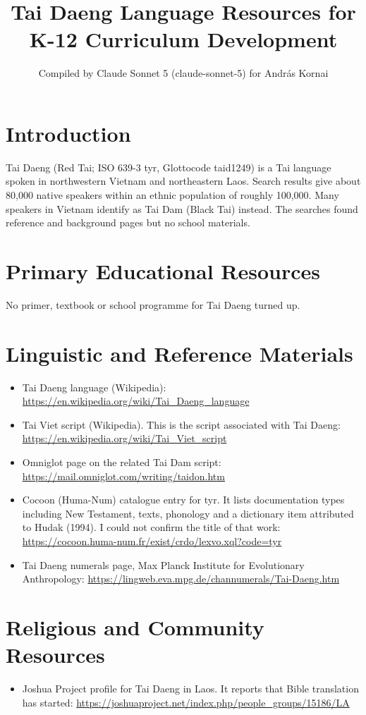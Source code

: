 \documentclass[12pt]{article}
\title{Tai Daeng Language Resources for K-12 Curriculum Development}
\author{Compiled by Claude Sonnet 5 (claude-sonnet-5) for Andr\'as Kornai}
\date{}
\begin{document}
\maketitle

\section{Introduction}
Tai Daeng (Red Tai; ISO 639-3 tyr, Glottocode taid1249) is a Tai language spoken in northwestern Vietnam and northeastern Laos. Search results give about 80,000 native speakers within an ethnic population of roughly 100,000. Many speakers in Vietnam identify as Tai Dam (Black Tai) instead. The searches found reference and background pages but no school materials.

\section{Primary Educational Resources}
No primer, textbook or school programme for Tai Daeng turned up.

\section{Linguistic and Reference Materials}
\begin{itemize}
\item Tai Daeng language (Wikipedia): \url{https://en.wikipedia.org/wiki/Tai_Daeng_language}
\item Tai Viet script (Wikipedia). This is the script associated with Tai Daeng: \url{https://en.wikipedia.org/wiki/Tai_Viet_script}
\item Omniglot page on the related Tai Dam script: \url{https://mail.omniglot.com/writing/taidon.htm}
\item Cocoon (Huma-Num) catalogue entry for tyr. It lists documentation types including New Testament, texts, phonology and a dictionary item attributed to Hudak (1994). I could not confirm the title of that work: \url{https://cocoon.huma-num.fr/exist/crdo/lexvo.xql?code=tyr}
\item Tai Daeng numerals page, Max Planck Institute for Evolutionary Anthropology: \url{https://lingweb.eva.mpg.de/channumerals/Tai-Daeng.htm}
\end{itemize}

\section{Religious and Community Resources}
\begin{itemize}
\item Joshua Project profile for Tai Daeng in Laos. It reports that Bible translation has started: \url{https://joshuaproject.net/index.php/people_groups/15186/LA}
\end{itemize}
\end{document}
